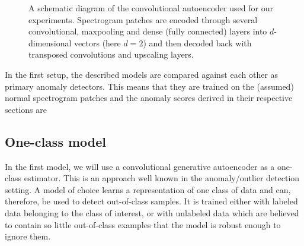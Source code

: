 \begin{figure}[htpb]
\begin{center}
\end{center}
\caption{A schematic diagram of the convolutional autoencoder used for our experiments. Spectrogram patches are encoded through several convolutional\cite{lecun1989backpropagation}, maxpooling\cite{ranzato2007efficient} and dense (fully connected) layers into $d$-dimensional vectors (here $d=2$) and then decoded back with transposed convolutions and upscaling layers.}
\label{fig:ae}
\end{figure}

In the first setup, the described models are compared against each other as primary anomaly detectors. This means that they are trained on the (assumed) normal spectrogram patches and the anomaly scores derived in their respective sections are 


\subsection{One-class model}
In the first model, we will use a convolutional generative autoencoder as a one-class estimator. This is an approach well known in the anomaly/outlier detection setting\cite{chandola2009anomaly,scholkopf2001estimating}. A model of choice learns a representation of one class of data and can, therefore, be used to detect out-of-class samples. It is trained either with labeled data belonging to the class of interest, or with unlabeled data which are believed to contain so little out-of-class examples that the model is robust enough to ignore them. 

